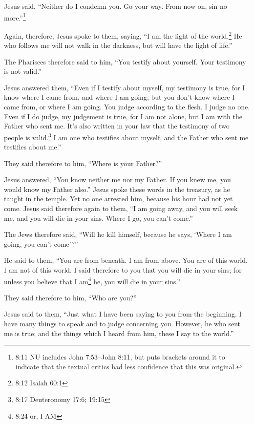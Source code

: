 Jesus said, ``Neither do I condemn you. Go your way. From now on, sin no
more.''\footnote{8:11 NU includes John 7:53--John 8:11, but puts
  brackets around it to indicate that the textual critics had less
  confidence that this was original.}

 Again, therefore, Jesus spoke to them, saying, ``I am the
light of the world.\footnote{8:12 Isaiah 60:1} He who follows me will
not walk in the darkness, but will have the light of life.''

 The Pharisees therefore said to him, ``You testify about
yourself. Your testimony is not valid.''

 Jesus answered them, ``Even if I testify about myself, my
testimony is true, for I know where I came from, and where I am going;
but you don't know where I came from, or where I am going. 
You judge according to the flesh. I judge no one.  Even if
I do judge, my judgement is true, for I am not alone, but I am with the
Father who sent me.  It's also written in your law that the
testimony of two people is valid.\footnote{8:17 Deuteronomy 17:6; 19:15}
 I am one who testifies about myself, and the Father who
sent me testifies about me.''

 They said therefore to him, ``Where is your Father?''

Jesus answered, ``You know neither me nor my Father. If you knew me, you
would know my Father also.''  Jesus spoke these words in
the treasury, as he taught in the temple. Yet no one arrested him,
because his hour had not yet come.  Jesus said therefore
again to them, ``I am going away, and you will seek me, and you will die
in your sins. Where I go, you can't come.''

 The Jews therefore said, ``Will he kill himself, because
he says, `Where I am going, you can't come'?''

 He said to them, ``You are from beneath. I am from above.
You are of this world. I am not of this world.  I said
therefore to you that you will die in your sins; for unless you believe
that I am\footnote{8:24 or, I AM} he, you will die in your sins.''

 They said therefore to him, ``Who are you?''

Jesus said to them, ``Just what I have been saying to you from the
beginning.  I have many things to speak and to judge
concerning you. However, he who sent me is true; and the things which I
heard from him, these I say to the world.''

